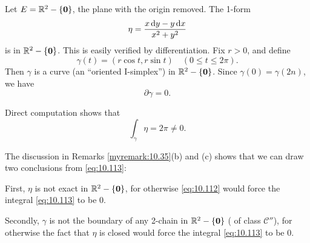 \begin{newexample}
    \label{newexample:10.36}
    Let $E = {\protect\mathbb R}^2 - \{\mathbf{0}\}$, the plane with the origin removed. 
    The 1-form 
    \begin{equation}
        \label{eq:10.110}
        \eta = \frac{x \d y - y \d x}{x^2+y^2}
    \end{equation}
    is  in ${\protect\mathbb R}^2 - \{\mathbf{0}\}$.
    This is easily verified by differentiation.
    Fix $r>0$, and define 
    \begin{equation}
        \label{eq:10.111}
        \gamma(t) = (r \cos t, r \sin t)
        \quad 
        (0 \leq t \leq 2\pi).
    \end{equation}
    Then $\gamma$ is a curve (an ``oriented I-simplex'') in ${\protect\mathbb R}^2 - \{\mathbf{0}\}$. 
    Since $\gamma(0) = \gamma(2n)$,
    we have
    \begin{equation}
        \label{eq:10.112}
        \partial \gamma = 0 .
    \end{equation}

    Direct computation shows that
    \begin{equation}
        \label{eq:10.113}
        \int_{\gamma} \eta = 2\pi \neq 0 .
    \end{equation}

    The discussion in Remarks \ref{myremark:10.35}(b) and (c) shows that we can draw two conclusions from \eqref{eq:10.113}:

    First, $\eta$ is not exact in ${\protect\mathbb R}^2 - \{\mathbf{0}\}$, for otherwise \eqref{eq:10.112} would force the integral \eqref{eq:10.113} to be 0. 
    
    Secondly, $\gamma$ is not the boundary of any 2-chain in ${\protect\mathbb R}^2 - \{\mathbf{0}\}$ ( of class $\mathscr{C}''$), for otherwise the fact that $\eta$ is closed would force the integral \eqref{eq:10.113} to be 0.
\end{newexample}


